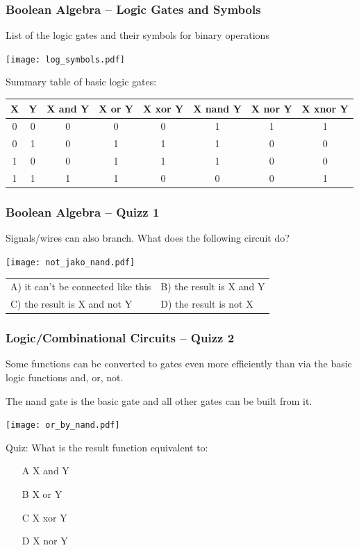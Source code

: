 \documentclass{beamer}
\begin{document}
\begin{frame}
\frametitle{Boolean Algebra -- Logic Gates and Symbols}

List of the logic gates and their symbols for binary operations
\begin{center}
   \texttt{[image: log\_symbols.pdf]}
\end{center}

Summary table of basic logic gates:
\begin{tabular}{|c|c|c|c|c|c|c|c|}\hline
X & Y & X and Y & X or Y & X xor Y & X nand Y & X nor Y & X xnor Y \\\hline
0 & 0 &    0    &   0    &    0    &     1    &    1    &    1     \\\hline
0 & 1 &    0    &   1    &    1    &     1    &    0    &    0     \\\hline
1 & 0 &    0    &   1    &    1    &     1    &    0    &    0     \\\hline
1 & 1 &    1    &   1    &    0    &     0    &    0    &    1     \\\hline
\end{tabular}

\end{frame}


\begin{frame}
\frametitle{Boolean Algebra -- Quizz 1}

Signals/wires can also branch. What does the following circuit do?
\begin{center}
   \texttt{[image: not\_jako\_nand.pdf]}
\end{center}

\begin{tabular}{ll}
A) it can't be connected like this \phantom{XXXX} & B) the result is X and Y\\
C) the result is X and not Y                     & D) the result is not X
\end{tabular}

\end{frame}


\begin{frame}
\frametitle{Logic/Combinational Circuits -- Quizz 2}

Some functions can be converted to gates even more efficiently than via the basic logic functions and, or, not.

The nand gate is the basic gate and all other gates can be built from it.

\begin{center}
   \texttt{[image: or\_by\_nand.pdf]}
\end{center}

Quiz: What is the result function equivalent to:
\begin{itemize}
\item[A] X and Y
\item[B] X or Y
\item[C] X xor Y
\item[D] X nor Y
\end{itemize}

\end{frame}
\end{document}
